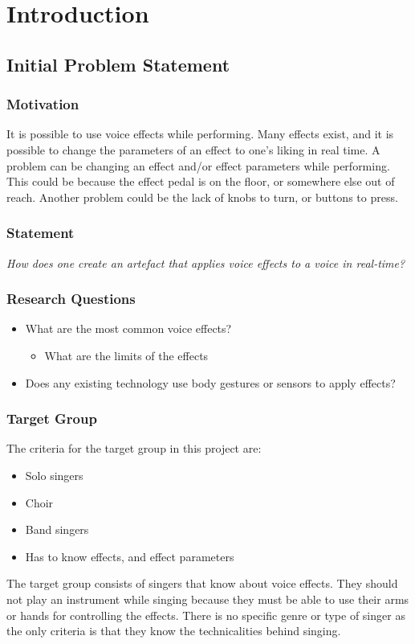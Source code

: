 \chapter{Introduction}\label{ch:Intro}

\section{Initial Problem Statement}

\subsection{Motivation}

It is possible to use voice effects while performing. Many effects exist, and it is possible to change the parameters of an effect to one's liking in real time. 
A problem can be changing an effect and/or effect parameters while performing. This could be because the effect pedal is on the floor, or somewhere else out of reach. Another problem could be the lack of knobs to turn, or buttons to press.

\subsection{Statement}

\textit{How does one create an artefact that applies voice effects to a voice in real-time?}


\subsection{Research Questions}\label{sub:ResearchQ}

\begin{itemize}
	\item What are the most common voice effects?
	\begin{itemize}
		\item What are the limits of the effects
	\end{itemize}
	\item Does any existing technology use body gestures or sensors to apply effects?
\end{itemize}

\subsection{Target Group}
The criteria for the target group in this project are:

\begin{itemize}
	\item Solo singers
	\item Choir
	\item Band singers
	\item Has to know effects, and effect parameters
\end{itemize}

The target group consists of singers that know about voice effects. They should not play an instrument while singing because they must be able to use their arms or hands for controlling the effects. There is no specific genre or type of singer as the only criteria is that they know the technicalities behind singing.

